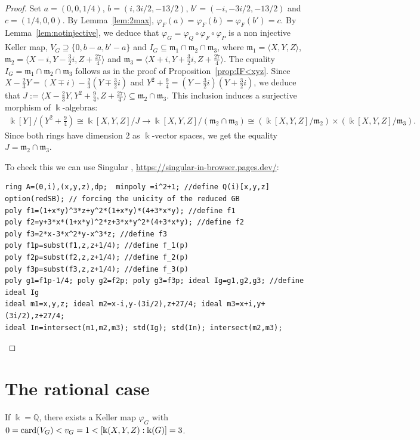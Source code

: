 \documentclass[11pt,reqno]{amsart}
\theoremstyle{definition}
\newcommand{\mbk}{\mbox{$\Bbbk$}}
\newcommand{\mbq}{\mbox{$\mathbb{Q}$}}
\newcommand{\mfm}{\mbox{$\mathfrak{m}$}}
\newcommand{\card}{\mbox{${\rm card}$}}
\begin{document}
\begin{proof}
Set $a=(0,0,1/4)$, $b=(i,3i/2,-13/2)$, $b'=(-i,-3i/2,-13/2)$ and $c=(1/4,0,0)$.
By Lemma~\ref{lem:2max}, $\varphi_F(a)=\varphi_F(b)=\varphi_F(b')=c$. 
By Lemma~\ref{lem:notinjective}, we deduce that 
$\varphi_G=\varphi_Q\circ\varphi_F\circ\varphi_P$ is a non injective Keller map, 
$V_G\supseteq \{0,b-a,b'-a\}$ and $I_G\subseteq\mfm_1\cap\mfm_2\cap \mfm_3$, where 
$\mfm_1=\langle X,Y,Z\rangle$, 
$\mfm_2=\langle X-i,Y-\tfrac{3}{2}i,Z+\tfrac{27}{4}\rangle$
and $\mfm_3=\langle X+i,Y+\tfrac{3}{2}i,Z+\tfrac{27}{4}\rangle$.
The equality $I_G=\mfm_1\cap\mfm_2\cap \mfm_3$ follows as in the proof of 
Proposition~\ref{prop:IF<xyz}. Since $X-\tfrac{2}{3}Y=(X\mp i)-\tfrac{2}{3}(Y\mp\tfrac{3}{2}i)$ and $Y^2+\tfrac{9}{4}=(Y-\tfrac{3}{2}i)(Y+\tfrac{3}{2}i)$, we deduce that
$J:=\langle X-\tfrac{2}{3}Y,Y^2+\tfrac{9}{4},Z+\tfrac{27}{4}\rangle\subseteq \mfm_2\cap\mfm_3$.
This inclusion induces a surjective morphism of $\mbk$-algebras:
\begin{eqnarray*}
\mbk[Y]/(Y^2+\tfrac{9}{4})\cong \mbk[X,Y,Z]/J\to\mbk[X,Y,Z]/(\mfm_2\cap\mfm_3)\cong 
(\mbk[X,Y,Z]/\mfm_2)\times(\mbk[X,Y,Z]/\mfm_3).
\end{eqnarray*}
Since both rings have dimension $2$ as $\mbk$-vector spaces, we get the equality 
$J=\mfm_2\cap\mfm_3$. 

To check this we can use
{\sc Singular} \cite{dgps}, \url{https://singular-in-browser.pages.dev/}:
\begin{verbatim}
ring A=(0,i),(x,y,z),dp;  minpoly =i^2+1; //define Q(i)[x,y,z]
option(redSB); // forcing the unicity of the reduced GB
poly f1=(1+x*y)^3*z+y^2*(1+x*y)*(4+3*x*y); //define f1 
poly f2=y+3*x*(1+x*y)^2*z+3*x*y^2*(4+3*x*y); //define f2
poly f3=2*x-3*x^2*y-x^3*z; //define f3
poly f1p=subst(f1,z,z+1/4); //define f_1(p)
poly f2p=subst(f2,z,z+1/4); //define f_2(p)
poly f3p=subst(f3,z,z+1/4); //define f_3(p)
poly g1=f1p-1/4; poly g2=f2p; poly g3=f3p; ideal Ig=g1,g2,g3; //define ideal Ig
ideal m1=x,y,z; ideal m2=x-i,y-(3i/2),z+27/4; ideal m3=x+i,y+(3i/2),z+27/4;
ideal In=intersect(m1,m2,m3); std(Ig); std(In); intersect(m2,m3);
\end{verbatim}
\end{proof}

\section{The rational case}

If $\mbk=\mbq$, there exists a Keller map $\varphi_G$ with
$0=\card(V_G)<v_G=1<[\mbk(X,Y,Z):\mbk(G)]=3$. 
\end{document}
